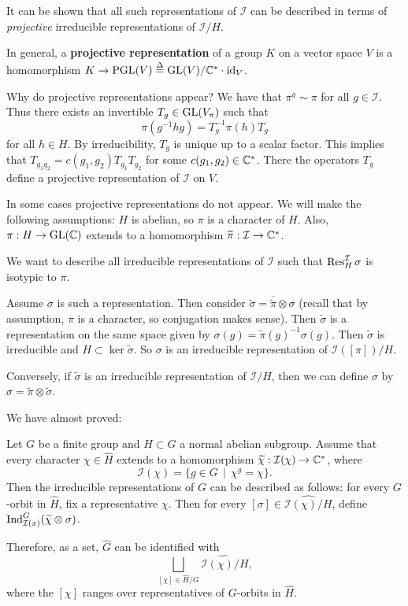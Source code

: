 \documentclass[11pt, english]{article}
\begin{document}
It can be shown that all such representations of $\mathcal I$ can be described in terms of \emph{projective} irreducible representations of $\mathcal I/H$. 

In general, a \textbf{projective representation} of a group $K$ on a vector space $V$ is a homomorphism $K \to \operatorname{PGL}(V) \stackrel{\Delta}{=} \operatorname{GL}(V)/ \mathbb{C}^\ast \cdot \text{id}_V$.

Why do projective representations appear? We have that $\pi^g \sim \pi$ for all $g \in \mathcal I$. Thus there exists an invertible $T_g \in \operatorname{GL}(V_\pi)$ such that
$$
\pi(g^{-1}hg) = T_g^{-1} \pi(h) T_g
$$
for all $h \in H$. By irreducibility, $T_g$ is unique up to a scalar factor. This implies that $T_{g_1g_2} = c(g_1,g_2)T_{g_1}T_{g_2}$ for some $c(g_1,g_2) \in \mathbb{C}^\ast$. There the operators $T_g$ define a projective representation of $\mathcal I$ on $V$.

In some cases projective representations do not appear. We will make the following assumptions: $H$ is abelian, so $\pi$ is a character of $H$. Also, $\pi:H \to \operatorname{GL}(\mathbb{C})$ extends to a homomorphism $\widetilde \pi: \mathcal I \to \mathbb{C}^\ast$.

We want to describe all irreducible representations of $\mathcal I$ such that $\operatorname{Res}_H^{\mathcal I} \sigma$ is isotypic to $\pi$. 

Assume $\sigma$ is such a representation. Then consider $\widetilde \sigma = \overline{\widetilde \pi} \otimes \sigma$ (recall that by assumption, $\pi$ is a character, so conjugation makes sense). Then $\widetilde \sigma$ is a representation on the same space given by $\sigma(g) = \widetilde \pi(g)^{-1} \sigma(g)$. Then $\widetilde \sigma$ is irreducible and $H \subset \ker \widetilde \sigma$. So $\sigma$ is an irreducible representation of $\mathcal I([\pi])/H$.

Conversely, if $\widetilde \sigma$ is an irreducible representation of $\mathcal I/H$, then we can define $\sigma$ by $\sigma = \widetilde \pi \otimes \widetilde \sigma$. 

We have almost proved:

\begin{thm}
 Let $G$ be a finite group and $H \subset G$ a normal abelian subgroup. Assume that every character $\chi \in \widehat H$ extends to a homomorphism $\widetilde \chi: \mathcal I(\chi) \to \mathbb{C}^\ast$, where
$$
\mathcal I(\chi) = \{ g \in G \, \mid \, \chi^g = \chi \}.
$$
Then the irreducible representations of $G$ can be described as follows: for every $G$-orbit in $\widehat H$, fix a representative $\chi$. Then for every $[\sigma] \in \widehat{ \mathcal I(\chi)/H}$, define $\operatorname{Ind}_{\mathcal I(x)}^G(\widetilde \chi \otimes \sigma)$. 

Therefore, as a set, $\widehat G$ can be identified with 
$$
\bigsqcup_{[\chi] \in \widehat H / G} \widehat{\mathcal I(\chi)/H},
$$
where the $[\chi]$ ranges over representatives of $G$-orbits in $\widehat H$.
\end{thm}
\end{document}
